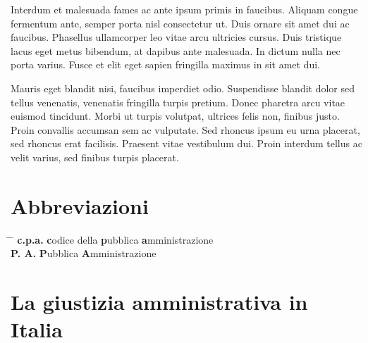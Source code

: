 \documentclass[12pt,it,a4paper,]{report}
\begin{document}
Interdum et malesuada fames ac ante ipsum primis in faucibus. Aliquam
congue fermentum ante, semper porta nisl consectetur ut. Duis ornare sit
amet dui ac faucibus. Phasellus ullamcorper leo vitae arcu ultricies
cursus. Duis tristique lacus eget metus bibendum, at dapibus ante
malesuada. In dictum nulla nec porta varius. Fusce et elit eget sapien
fringilla maximus in sit amet dui.

Mauris eget blandit nisi, faucibus imperdiet odio. Suspendisse blandit
dolor sed tellus venenatis, venenatis fringilla turpis pretium. Donec
pharetra arcu vitae euismod tincidunt. Morbi ut turpis volutpat,
ultrices felis non, finibus justo. Proin convallis accumsan sem ac
vulputate. Sed rhoncus ipsum eu urna placerat, sed rhoncus erat
facilisis. Praesent vitae vestibulum dui. Proin interdum tellus ac velit
varius, sed finibus turpis placerat.

\newpage


\tableofcontents

\newpage

\listoffigures

\newpage

\listoftables

\newpage

\hypertarget{abbreviazioni}{%
\chapter*{Abbreviazioni}\label{abbreviazioni}}

\begin{tabbing}
\hspace{12em} \= \hspace{60em} \= \kill
\textbf{c.p.a.} \> \textbf{c}odice della \textbf{p}ubblica \textbf{a}mministrazione \\
\textbf{P. A.} \> \textbf{P}ubblica \textbf{A}mministrazione \\
\end{tabbing}

\newpage

\setcounter{page}{1}
\doublespacing
\setlength{\parindent}{0.5in}

\hypertarget{la-giustizia-amministrativa-in-italia}{%
\chapter{La giustizia amministrativa in
Italia}\label{la-giustizia-amministrativa-in-italia}}
\end{document}
